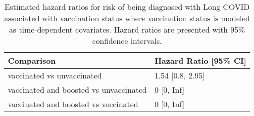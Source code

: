 \begin{table}[!htbp]
\centering
\begin{tabular}{ll}
  \hline
Comparison & Hazard Ratio [95\% CI] \\ 
  \hline
vaccinated vs unvaccinated & 1.54 [0.8, 2.95] \\ 
  vaccinated and boosted vs unvaccinated & 0 [0, Inf] \\ 
  vaccinated and boosted vs vaccinated & 0 [0, Inf] \\ 
   \hline
\end{tabular}
\caption{Estimated hazard ratios for risk of being diagnosed with Long COVID associated with vaccination status where vaccination status is modeled as time-dependent covariates. Hazard ratios are presented with 95\% confidence intervals.} 
\label{tab:cox_time_dep_after_emm_pairs_diag}
\end{table}
